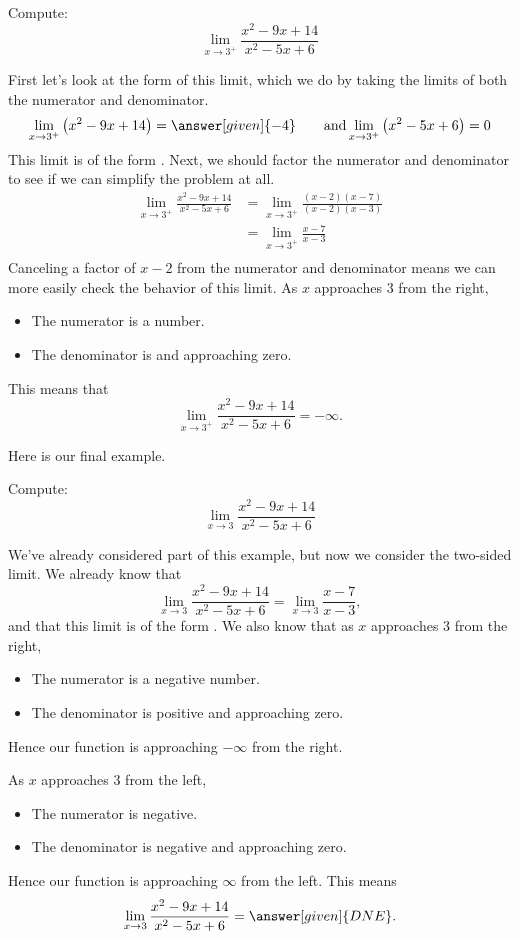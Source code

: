 \documentclass{ximera}
\begin{document}
\begin{example}
  Compute:
  \[
  \lim_{x\to 3^+} \frac{x^2-9x+14}{x^2-5x+6}
  \]
  \begin{explanation}
    First let's look at the form of this limit, which we do by taking the limits of both the numerator and denominator.
    \[
    \lim_{x\to 3^+} \left(x^2-9x+14\right) = \answer[given]{-4}\qquad\text{and}\lim_{x\to3^+}\left(x^2-5x+6\right) = 0
    \]
    This limit is of the form \numOverZero. Next, we should factor the numerator and denominator to see if we can simplify the problem at all. 
    \begin{align*}
      \lim_{x\to 3^+}\frac{x^2-9x+14}{x^2-5x+6} &= \lim_{x\to 3^+}\frac{(x-2)(x-7)}{(x-2)(x-3)}\\
      &= \lim_{x\to 3^+}\frac{x-7}{x-3}\\
    \end{align*}
    Canceling a factor of $x-2$ from the numerator and denominator means we can more easily check the behavior of this limit.  As $x$ approaches $3$ from the right,
    \begin{itemize}
    \item The numerator is a  number. 
    \item The denominator is  and approaching zero.
    \end{itemize}
    This means that
    \[
    \lim_{x\to 3^+} \frac{x^2-9x+14}{x^2-5x+6} = -\infty.
    \]
   \end{explanation}
\end{example}

Here is our final example.

\begin{example}
  Compute:
  \[
  \lim_{x\to 3} \frac{x^2-9x+14}{x^2-5x+6}
  \]
  \begin{explanation}
    We've already considered part of this example, but now we consider the two-sided limit. We already know that
    \[
    \lim_{x\to 3} \frac{x^2-9x+14}{x^2-5x+6} = \lim_{x\to
      3}\frac{x-7}{x-3},
    \]
    and that this limit is of the form \numOverZero.
    We also know that as $x$ approaches $3$ from the right,
    \begin{itemize}
    \item The numerator is a negative number. 
    \item The denominator is positive and approaching zero.
    \end{itemize}
    Hence our function is approaching $-\infty$ from the right.
    
    As $x$ approaches $3$ from the left,
    \begin{itemize}
    \item The numerator is negative.
    \item The denominator is negative and approaching zero.
    \end{itemize}
    Hence our function is approaching $\infty$ from the left.
    This means
    \[
    \lim_{x\to 3} \frac{x^2-9x+14}{x^2-5x+6} = \answer[given]{DNE}.
    \]
  \end{explanation}
\end{example}
\end{document}
